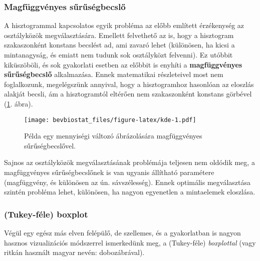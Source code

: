 \documentclass[]{book}
\newenvironment{Shaded}{\begin{snugshade}}{\end{snugshade}}
\newcommand{\KeywordTok}[1]{\textcolor[rgb]{0.13,0.29,0.53}{\textbf{#1}}}
\newcommand{\DataTypeTok}[1]{\textcolor[rgb]{0.13,0.29,0.53}{#1}}
\newcommand{\StringTok}[1]{\textcolor[rgb]{0.31,0.60,0.02}{#1}}
\newcommand{\OperatorTok}[1]{\textcolor[rgb]{0.81,0.36,0.00}{\textbf{#1}}}
\newcommand{\NormalTok}[1]{#1}
\begin{document}
\subsubsection{Magfüggvényes
sűrűségbecslő}\label{deskriptivmennyegyvaltgrafikuskde}

A hisztogrammal kapcsolatos egyik probléma az előbb említett érzékenység
az osztályközök megválasztására. Emellett felvethető az is, hogy a
hisztogram szakaszonként konstans becslést ad, ami zavaró lehet
(különösen, ha kicsi a mintanagyság, és emiatt nem tudunk sok
osztályközt felvenni). Ez utóbbit kiküszöböli, és sok gyakorlati esetben
az előbbit is enyhíti a \textbf{magfüggvényes sűrűségbecslő}
alkalmazása. Ennek matematikai részleteivel most nem foglalkozunk,
megelégszünk annyival, hogy a hisztogramhoz hasonlóan az eloszlás
alakját becsli, ám a hisztogramtól eltérően nem szakaszonként konstans
görbével (\ref{fig:kde}. ábra).

\begin{Shaded}
\end{Shaded}

\begin{figure}
\centering
\texttt{[image: bevbiostat\_files/figure-latex/kde-1.pdf]}
\caption{\label{fig:kde}Példa egy mennyiségi változó ábrázolására
magfüggvényes sűrűségbecslővel.}
\end{figure}

Sajnos az osztályközök megválasztásának problémája teljesen nem oldódik
meg, a magfüggvényes sűrűségbecslőnek is van ugyanis állítható
paramétere (magfüggvény, és különösen az ún. sávszélesség). Ennek
optimális megválasztása szintén probléma lehet, különösen, ha nagyon
egyenetlen a mintaelemek eloszlása.

\subsubsection{(Tukey-féle)
boxplot}\label{deskriptivmennyegyvaltgrafikusboxplot}

Végül egy egész más elven felépülő, de szellemes, és a gyakorlatban is
nagyon hasznos vizualizációs módszerrel ismerkedünk meg, a (Tukey-féle)
\emph{boxplottal} (vagy ritkán használt magyar nevén: dobozábrával).
\end{document}
